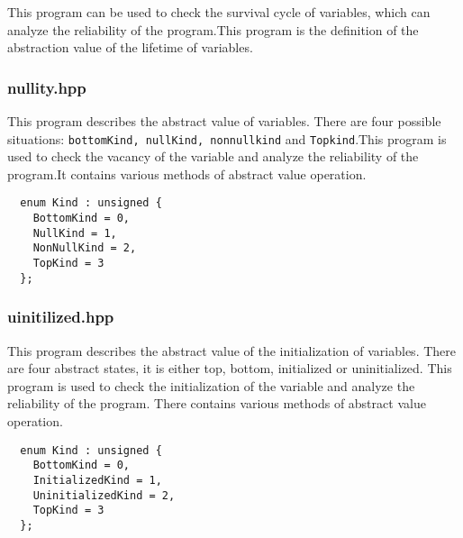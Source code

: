 \documentclass[12pt]{article}
\begin{document}
This program can be used to check the survival cycle of variables, which can analyze the reliability of the program.This program is the definition of the abstraction value of the lifetime of variables.

\subsubsection{nullity.hpp}
This program describes the abstract value of variables. There are four possible situations: \texttt {bottomKind, nullKind, nonnullkind} and \texttt {Topkind}.This program is used to check the vacancy of the variable and analyze the reliability of the program.It contains various methods of abstract value operation.
\begin{lstlisting}
  enum Kind : unsigned {
    BottomKind = 0,
    NullKind = 1,
    NonNullKind = 2,
    TopKind = 3
  };
\end{lstlisting}

\subsubsection{uinitilized.hpp}
This program describes the abstract value of the initialization of variables. There are four abstract states, it is either top, bottom, initialized or uninitialized. This program is used to check the initialization of the variable and analyze the reliability of the program. There contains various methods of abstract value operation.
\begin{lstlisting}
  enum Kind : unsigned {
    BottomKind = 0,
    InitializedKind = 1,
    UninitializedKind = 2,
    TopKind = 3
  };
\end{lstlisting}
\end{document}
